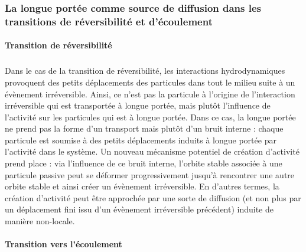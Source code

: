 \subsubsection{La longue portée comme source de diffusion dans les transitions de réversibilité et d'écoulement}

\paragraph{Transition de réversibilité}

\subparagraph{}Dans le cas de la transition de réversibilité, les interactions hydrodynamiques provoquent des petits déplacements des particules dans tout le milieu suite à un évènement irréversible. Ainsi, ce n'est pas la particule à l'origine de l'interaction irréversible qui est transportée à longue portée, mais plutôt l'influence de l'activité sur les particules qui est à longue portée. Dans ce cas, la longue portée ne prend pas la forme d'un transport mais plutôt d'un bruit interne : chaque particule est soumise à des petits déplacements induits à longue portée par l'activité dans le système. Un nouveau mécanisme potentiel de création d'activité prend place : via l'influence de ce bruit interne, l'orbite stable associée à une particule passive peut se déformer progressivement jusqu'à rencontrer une autre orbite stable et ainsi créer un évènement irréversible. En d'autres termes, la création d'activité peut être approchée par une sorte de diffusion (et non plus par un déplacement fini issu d'un évènement irréversible précédent) induite de manière non-locale.

\paragraph{Transition vers l'écoulement}

